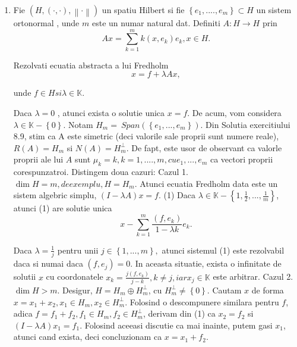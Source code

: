 \documentclass[a4paper,12pt,oneside]{report}
\begin{document}
\begin{enumerate}
		      			      			      			      			      	    
		      	\item Fie \(\left ( H, \left ( \cdot ,\cdot  \right ), \left \| \cdot  \right \| \right )\) un spatiu Hilbert si fie \(\left \{ e_{1},...., e_{m} \right \} \subset H\) un sistem ortonormal , unde \(m\) este un numar natural dat. Definiti \(A : H \rightarrow H\) prin 
		      	\begin{displaymath}
		      		Ax = \sum_{k = 1 }^{m} k\left ( x,e_{k} \right )e_{k}, x \in H. 
		      	\end{displaymath}
		      			      			      	
		      	Rezolvati ecuatia abstracta a lui Fredholm 
		      	\begin{displaymath}
		      		x = f + \lambda Ax, 
		      	\end{displaymath}
		      			      			      	
		      	unde \(f\in H si \lambda \in \mathbb{K}\). 
		      			      			      	
		      	Daca \(\lambda = 0\) , atunci exista o solutie unica \(x = f\). De acum, vom considera \(\lambda \in \mathbb{K} - \left \{ 0 \right \}\). Notam \(H _{m} = \ Span \left ( \left \{ e_{1},...,e_{m} \right \} \right )\). Din Solutia exercitiului 8.9, stim ca A este simetric (deci valorile sale proprii sunt numere reale), \(R\left ( A \right ) = H_{m}\) si  \(N\left ( A \right ) = H_{m}^{\perp }\). De fapt, este usor de observant ca valorle proprii ale lui \(A\) sunt \(\mu _{k} = k, k = 1,....,m , cu e_{1},...,e_{m}\) ca vectori proprii corespunzatroi. 
		      	Distingem doua cazuri:
		      	Cazul 1.
		      	\(\dim H = m, de exemplu, H = H_{m}\). Atunci ecuatia Fredholm data este un sistem algebric simplu, \(\left ( I - \lambda A \right )x = f\). (1)
		      	Daca \(\lambda \in \mathbb{K} - \left \{ 1,\frac{1}{2},...,\frac{1}{m} \right \}\), atunci (1) are solutie unica 
		      	\begin{displaymath}
		      		x - \sum_{k = 1}^{m}\frac{\left ( f,e_{k} \right )}{1 - \lambda k}e_{k}. 
		      	\end{displaymath}
		      			      			      	
		      	Daca \(\lambda  = \frac{1}{j}\) pentru unii \(j \in \left \{ 1,...,m \right \},\) atunci sistemul (1) este rezolvabil daca si numai daca \(\left ( f,e_{j} \right ) = 0\). In aceasta situatie, exista o infinitate de solutii \(x\) cu coordonatele \(x_{k} = \frac{j\left ( f,e_{k} \right )}{j-k }, k\neq j,iar x_{j} \in \mathbb{K}\) este arbitrar. 
		      	Cazul 2.
		      	\(\dim H > m\). Desigur, \(H = H_{m}\oplus H_{m}^{\perp }\), cu  \(H_{m}^{\perp }\neq \left \{ 0 \right \}\). Cautam \(x\) de forma \(x = x_{1} + x_{2}, x_{1} \in H_{m}, x_{2} \in H_{m}^{\perp }\). Folosind o descompunere similara pentru \(f\), adica \(f = f_{1} + f_{2}, f_{1} \in H_{m}, f_{2} \in H_{m}^{\perp }\), derivam din (1) ca \(x_{2} = f_{2}\) si \(\left ( I - \lambda A \right )x _{1} = f_{1}\). Folosind aceeasi discutie ca mai inainte, putem gasi \(x_{1}\), atunci cand exista, deci concluzionam ca \(x = x_{1} + f_{2}\). 
		      			      			      	

\end{enumerate}
\end{document}
